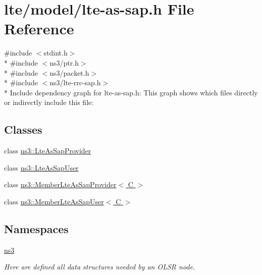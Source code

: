 \hypertarget{lte-as-sap_8h}{}\section{lte/model/lte-\/as-\/sap.h File Reference}
\label{lte-as-sap_8h}
{\ttfamily \#include $<$stdint.\+h$>$}\\*
{\ttfamily \#include $<$ns3/ptr.\+h$>$}\\*
{\ttfamily \#include $<$ns3/packet.\+h$>$}\\*
{\ttfamily \#include $<$ns3/lte-\/rrc-\/sap.\+h$>$}\\*
Include dependency graph for lte-\/as-\/sap.h\+:
This graph shows which files directly or indirectly include this file\+:
\subsection*{Classes}
\begin{DoxyCompactItemize}
\item 
class \hyperlink{classns3_1_1LteAsSapProvider}{ns3\+::\+Lte\+As\+Sap\+Provider}
\item 
class \hyperlink{classns3_1_1LteAsSapUser}{ns3\+::\+Lte\+As\+Sap\+User}
\item 
class \hyperlink{classns3_1_1MemberLteAsSapProvider}{ns3\+::\+Member\+Lte\+As\+Sap\+Provider$<$ C $>$}
\item 
class \hyperlink{classns3_1_1MemberLteAsSapUser}{ns3\+::\+Member\+Lte\+As\+Sap\+User$<$ C $>$}
\end{DoxyCompactItemize}
\subsection*{Namespaces}
\begin{DoxyCompactItemize}
\item 
 \hyperlink{namespacens3}{ns3}
\begin{DoxyCompactList}\small\item\em Here are defined all data structures needed by an O\+L\+SR node. \end{DoxyCompactList}\end{DoxyCompactItemize}

